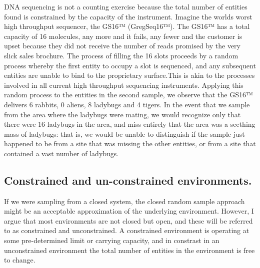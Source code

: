 \documentclass[
  onecolumn]{article}
\begin{document}
DNA sequencing is not a counting exercise because the total number of entities found is constrained by the capacity of the instrument. Imagine the worlds worst high throughput sequencer, the GS16™ (GregSeq16™). The GS16™ has a total capacity of 16 molecules, any more and it fails, any fewer and the customer is upset because they did not receive the number of reads promised by the very slick sales brochure. The process of filling the 16 slots proceeds by a random process whereby the first entity to occupy a slot is sequenced, and any subsequent entities are unable to bind to the proprietary surface.This is akin to the processes involved in all current high throughput sequencing instruments. Applying this random process to the entities in the second sample, we observe that the GS16™ delivers 6 rabbits, 0 aliens, 8 ladybugs and 4 tigers. In the event that we sample from the area where the ladybugs were mating, we would recognize only that there were 16 ladybugs in the area, and miss entirely that the area was a seething mass of ladybugs: that is, we would be unable to distinguish if the sample just happened to be from a site that was missing the other entities, or from a site that contained a vast number of ladybugs.

\hypertarget{constrained-and-un-constrained-environments.}{%
\subsection{Constrained and un-constrained environments.}\label{constrained-and-un-constrained-environments.}}

If we were sampling from a closed system, the closed random sample approach might be an acceptable approximation of the underlying environment. However, I argue that most environments are not closed but open, and these will be referred to as constrained and unconstrained. A constrained environment is operating at some pre-determined limit or carrying capacity, and in constrast in an unconstrained environment the total number of entities in the environment is free to change.
\end{document}
